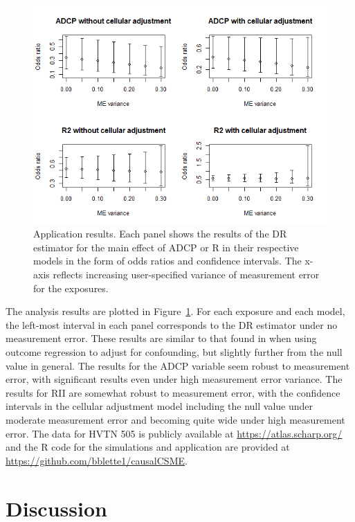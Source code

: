 \documentclass[useAMS,usenatbib,referee]{biom}
\newcommand{\RNum}[1]{\uppercase\expandafter{\romannumeral #1\relax}}
\begin{document}
\begin{figure}[h!]
\centering
\includegraphics[width=5.9in]{Figure2.png}
\caption{Application results. Each panel shows the results of the DR estimator for the main effect of ADCP or R\RNum{2} in their respective models in the form of odds ratios and confidence intervals. The x-axis reflects increasing user-specified variance of measurement error for the exposures.}
\label{fig:two}
\end{figure}

The analysis results are plotted in Figure~\ref{fig:two}. For each exposure and each model, the left-most interval in each panel corresponds to the DR estimator under no measurement error. These results are similar to that found in \citet{neidich2019} when using outcome regression to adjust for confounding, but slightly further from the null value in general. The results for the ADCP variable seem robust to measurement error, with significant results even under high measurement error variance. The results for RII are somewhat robust to measurement error, with the confidence intervals in the cellular adjustment model including the null value under moderate measurement error and becoming quite wide under high measurement error. The data for HVTN 505 is publicly available at \href{https://atlas.scharp.org/cpas/project/HVTN\%20Public\%20Data/HVTN\%20505/begin.view?}{https://atlas.scharp.org/} and the R code for the simulations and application are provided at \href{https://github.com/bblette1/causalCSME}{https://github.com/bblette1/causalCSME}.

\section{Discussion}
\end{document}
